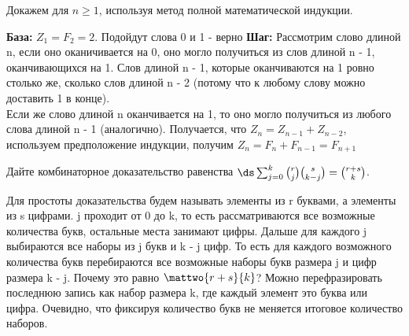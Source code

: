 \documentclass[11pt]{article}
\begin{document}
Докажем для $n \geq 1$, используя метод полной математической индукции. \sspace

\textbf{База:} \sspace 
$Z_1 = F_2 = 2$. Подойдут слова 0 и 1 - верно
\sspace
\textbf{Шаг:} \sspace
Рассмотрим слово длиной n, если оно оканичивается на 0, оно могло получиться из слов длиной n - 1, оканчивающихся на 1. Слов длиной n - 1, которые оканчиваются на 1 ровно столько же, сколько слов длиной n - 2 (потому что к любому слову можно доставить 1 в конце). \\
Если же слово длиной n оканчивается на 1, то оно могло получиться из любого слова длиной n - 1 (аналогично). Получается, что $Z_n = Z_{n - 1} + Z_{n - 2}$, используем предположение индукции, получим $Z_n = F_{n} + F_{n - 1} = F_{n + 1}$ \bs

\p
  Дайте комбинаторное доказательство равенства  
  $\ds
  \sum_{j=0}^k\binom{r}{j}\binom{s}{k-j} = \binom{r+s}{k}$.

Для простоты доказательства будем называть элементы из r буквами, а элементы из s цифрами. j проходит от 0 до k, то есть рассматриваются все возможные количества букв, остальные места занимают цифры. Дальше для каждого j выбираются все наборы из j букв и k - j цифр. То есть для каждого возможного количества букв перебираются все возможные наборы букв размера j и цифр размера k - j. Почему это равно $\mattwo{r + s}{k}$? Можно перефразировать последнюю запись как набор размера k, где каждый элемент это буква или цифра. Очевидно, что фиксируя количество букв не меняется итоговое количество наборов.
\end{document}
